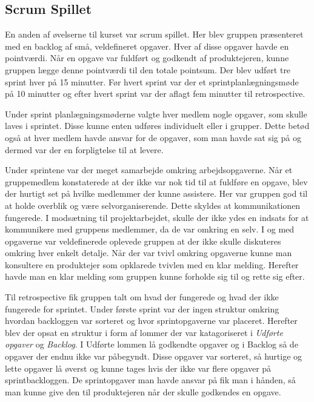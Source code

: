 \subsection{Scrum Spillet}
En anden af øvelserne til kurset var scrum spillet. Her blev gruppen præsenteret med en backlog af små, veldefineret opgaver. Hver af disse opgaver havde en pointværdi. Når en opgave var fuldført og godkendt af produktejeren, kunne gruppen lægge denne pointværdi til den totale pointsum. Der blev udført tre sprint hver på 15 minutter. Før hvert sprint var der et sprintplanlægningsmøde på 10 minutter og efter hvert sprint var der aflagt fem minutter til retrospective. \newline

Under sprint planlægningsmøderne valgte hver medlem nogle opgaver, som skulle laves i sprintet. Disse kunne enten udføres individuelt eller i grupper. Dette betød også at hver medlem havde ansvar for de opgaver, som man havde sat sig på og dermed var der en forpligtelse til at levere. \newline

Under sprintene var der meget samarbejde omkring arbejdsopgaverne. Når et gruppemedlem konstaterede at der ikke var nok tid til at fuldføre en opgave, blev der hurtigt set på hvilke medlemmer der kunne assistere. Her var gruppen god til at holde overblik og være selvorganiserende. Dette skyldes at kommunikationen fungerede. I modsætning til projektarbejdet, skulle der ikke ydes en indsats for at kommunikere med gruppens medlemmer, da de var omkring en selv. 
I og med opgaverne var veldefinerede oplevede gruppen at der ikke skulle diskuteres omkring hver enkelt detalje. Når der var tvivl omkring opgaverne kunne man konsultere en produktejer som opklarede tvivlen med en klar melding. Herefter havde man en klar melding som gruppen kunne forholde sig til og rette sig efter.  \newline

Til retrospective fik gruppen talt om hvad der fungerede og hvad der ikke fungerede for sprintet. Under første sprint var der ingen struktur omkring hvordan backloggen var sorteret og hvor sprintopgaverne var placeret. Herefter blev der opsat en struktur i form af lommer der var katagoriseret i \textit{Udførte opgaver} og \textit{Backlog}. I Udførte lommen lå godkendte opgaver og i Backlog så de opgaver der endnu ikke var påbegyndt. Disse opgaver var sorteret, så hurtige og lette opgaver lå øverst og kunne tages hvis der ikke var flere opgaver på sprintbackloggen. De sprintopgaver man havde ansvar på fik man i hånden, så man kunne give den til produktejeren når der skulle godkendes en opgave. \newline

